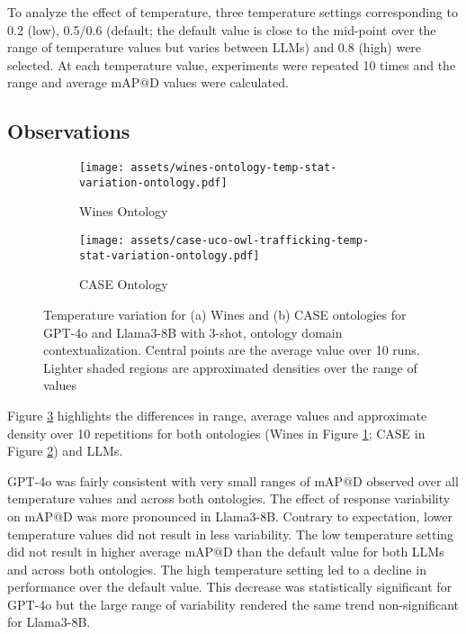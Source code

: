 \documentclass[a4paper,colorinlistoftodos]{article}
\begin{document}
To analyze the effect of temperature, three temperature settings corresponding
to 0.2 (low), 0.5/0.6 (default; the default value is close to the mid-point
over the range of temperature values but varies between LLMs) and 0.8 (high)
were selected. At each temperature value, experiments were repeated 10 times
and the range and average $\text{mAP@D}$ values were calculated.

\subsection{Observations}
\label{subsec:temp-variation-prev-observations}

\begin{figure}
\begin{subfigure}{0.5\textwidth} \centering
    \caption{Wines Ontology}
    \label{fig:prev-wines-temp-variation}
\texttt{[image: assets/wines-ontology-temp-stat-variation-ontology.pdf]}
\end{subfigure} \hspace{0.2cm}
\begin{subfigure}{0.5\textwidth} \centering
    \caption{CASE Ontology}
    \label{fig:prev-case-temp-variation}
\texttt{[image: assets/case-uco-owl-trafficking-temp-stat-variation-ontology.pdf]}
\end{subfigure}
\caption{Temperature variation for (a) Wines and (b) CASE ontologies for
GPT-4o and Llama3-8B with 3-shot, ontology domain contextualization. Central
points are the average value over 10 runs. Lighter shaded regions are
approximated densities over the range of values}
\label{fig:prev-temp-variation}
\end{figure}

Figure \ref{fig:prev-temp-variation} highlights the differences in range,
average values and approximate density over 10 repetitions for both ontologies
(Wines in Figure \ref{fig:prev-wines-temp-variation}; CASE in Figure
\ref{fig:prev-case-temp-variation}) and LLMs.

GPT-4o was fairly consistent with very small ranges of $\text{mAP@D}$ observed
over all temperature values and across both ontologies. The effect of response
variability on $\text{mAP@D}$ was more pronounced in Llama3-8B. Contrary to
expectation, lower temperature values did not result in less variability. The
low temperature setting did not result in higher average $\text{mAP@D}$ than
the default value for both LLMs and across both ontologies. The high
temperature setting led to a decline in performance over the default
value. This decrease was statistically significant for GPT-4o but the large
range of variability rendered the same trend non-significant for Llama3-8B.
\end{document}
